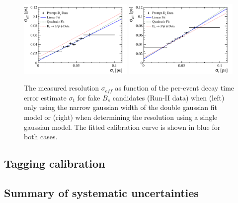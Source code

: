     
\begin{figure}[h]
\centering
\includegraphics[height=!,width=0.49\textwidth]{figs/Resolution/ScaleFactor_Data_coreGauss.pdf}
\includegraphics[height=!,width=0.49\textwidth]{figs/Resolution/ScaleFactor_Data_singleGauss.pdf}
\caption{The measured resolution $\sigma_{eff}$ as function of the per-event decay time error estimate $\sigma_t$ for fake $B_s$ candidates (Run-II data) 
when (left) only using the narrow gaussian width of the double gaussian fit model or (right) when determining the resolution using a single gaussian model.
The fitted calibration curve is shown in blue for both cases.}
\label{fig:SystscaleFactor}
\end{figure}


\subsection{Tagging calibration}



\subsection{Summary of systematic uncertainties}
